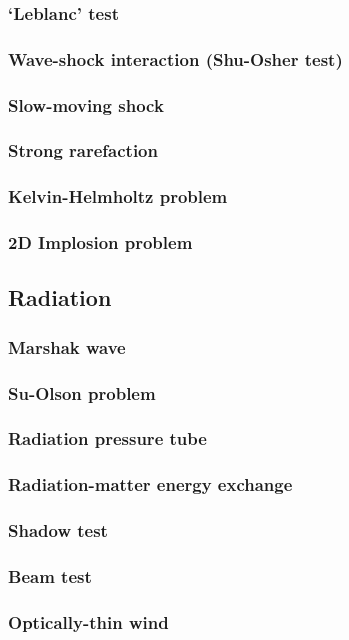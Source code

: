 \documentclass[fleqn,usenatbib]{mnras}
\begin{document}
\subsubsection{`Leblanc' test}
\subsubsection{Wave-shock interaction (Shu-Osher test)}
\subsubsection{Slow-moving shock}
\subsubsection{Strong rarefaction}
\subsubsection{Kelvin-Helmholtz problem}
\subsubsection{2D Implosion problem}

\subsection{Radiation}
\subsubsection{Marshak wave}
\subsubsection{Su-Olson problem}
\subsubsection{Radiation pressure tube}
\subsubsection{Radiation-matter energy exchange}
\subsubsection{Shadow test}
\subsubsection{Beam test}
\subsubsection{Optically-thin wind}
\end{document}
